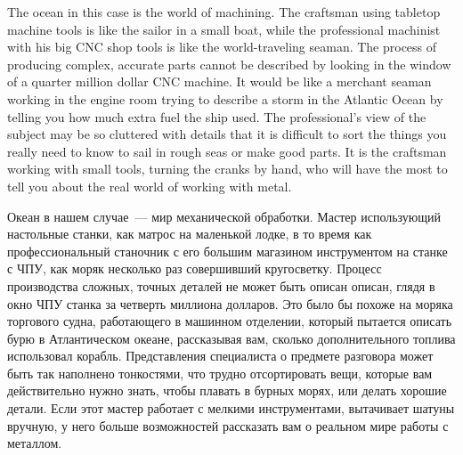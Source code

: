 \begin{enen}
The ocean in this case is the world of machining. The craftsman using tabletop
machine tools is like the sailor in a small boat, while the professional
machinist with his big CNC shop tools is like the world-traveling seaman. The
process of producing complex, accurate parts cannot be described by looking in
the window of a quarter million dollar CNC machine. It would be like a merchant
seaman working in the engine room trying to describe a storm in the Atlantic
Ocean by telling you how much extra fuel the ship used. The professional's view
of the subject may be so cluttered with details that it is difficult to sort the
things you really need to know to sail in rough seas or make good parts. It is
the craftsman working with small tools, turning the cranks by hand, who will
have the most to tell you about the real world of working with metal.
\end{enen}

\begin{ruru}
Океан в нашем случае\ --- мир механической обработки. Мастер использующий
настольные станки, как матрос на маленькой лодке, в то время как
профессиональный станочник с его большим магазином инструментом на станке с ЧПУ,
как моряк несколько раз совершивший кругосветку. Процесс производства сложных,
точных деталей не может быть описан описан, глядя в окно ЧПУ станка за четверть
миллиона долларов. Это было бы похоже на моряка торгового судна, работающего в
машинном отделении, который пытается описать бурю в Атлантическом океане,
рассказывая вам, сколько дополнительного топлива использовал корабль.
Представления специалиста о предмете разговора может быть так наполнено
тонкостями, что трудно отсортировать вещи, которые вам действительно нужно
знать, чтобы плавать в бурных морях, или делать хорошие детали. Если этот мастер
работает с мелкими инструментами, вытачивает шатуны вручную, у него больше
возможностей рассказать вам о реальном мире работы с металлом.
\end{ruru}


